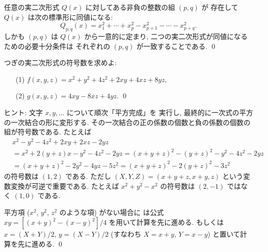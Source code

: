 \documentclass[12pt,twoside]{jarticle}
\begin{document}
\begin{theorem}
  任意の実二次形式 $Q(x)$ に対してある非負の整数の組 $(p,q)$ が
  存在して $Q(x)$ は次の標準形に同値になる:
  \begin{equation*}
    Q_{p,q}(x) = x_1^2 + \cdots + x_p^2 - x_{p+1}^2 - \cdots - x_{p+q}^2.
  \end{equation*}
  しかも $(p,q)$ は $Q(x)$ から一意的に定まり, 
  二つの実二次形式が同値になるための必要十分条件は
  それぞれの $(p,q)$ が一致することである.
  \qed
\end{theorem}

\begin{question}[10点]
  つぎの実二次形式の符号数を求めよ:
  \begin{itemize}
  \item[(1)] $f(x,y,z) = x^2 + y^2 + 4z^2 + 2xy + 4xz + 8yz$,
  \item[(2)] $g(x,y,z) = 4xy - 8xz + 4yz$.
    \qed
  \end{itemize}
\end{question}

\medskip\noindent
ヒント: 文字 $x,y,\ldots$ について順次「平方完成」を
実行し, 最終的に一次式の平方の一次結合の形に変形する.
その一次結合の正の係数の個数と負の係数の個数の組が符号数である.
たとえば 
\begin{align*}
  &
  x^2 - y^2 - 4z^2 + 2xy + 2xz - 2yz
  \\ &
  = x^2 + 2(y+z)x - y^2 - 4z^2 - 2yz
  = (x+y+z)^2 - (y+z)^2 - y^2 - 4z^2 - 2yz
  \\ &
  = (x+y+z)^2 - 2y^2 - 4yz - 5z^2
  = (x+y+z)^2 - 2(y+z)^2 - 3z^2
\end{align*}
の符号数は $(1,2)$ である.
ただし $(X,Y,Z)=(x+y+z, x+y, z)$ という変数変換が可逆で重要である.
たとえば $x^2 + y^2 - x^2$ の符号数は $(2,-1)$ ではなく $(1,0)$ である.

平方項 ($x^2$, $y^2$, $z^2$ のような項) がない場合に
は公式 $xy = [(x+y)^2 - (x-y)^2]/4$ を用いて計算を先に進める.
もしくは $x=(X+Y)/2$, $y=(X-Y)/2$ 
(すなわち $X=x+y$, $Y=x-y$) と置いて計算を先に進める. \qed
\end{document}
